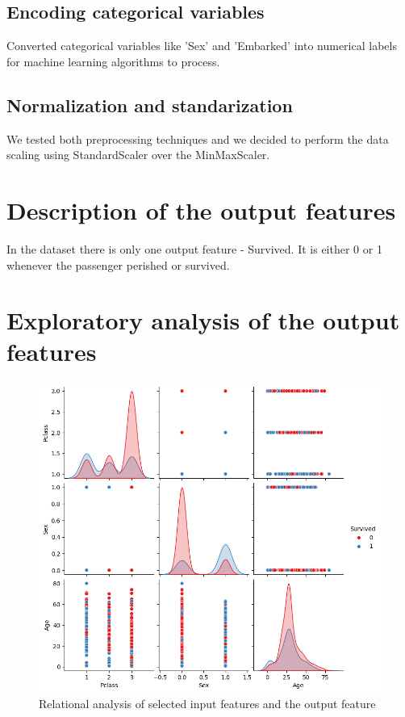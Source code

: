 \documentclass{article}
\begin{document}
\subsection{Encoding categorical variables}

Converted categorical variables like 'Sex' and 'Embarked' into numerical labels for machine learning algorithms to process.

\subsection{Normalization and standarization}

We tested both preprocessing techniques and we decided to perform the data scaling using StandardScaler over the MinMaxScaler.

\section{Description of the output features}

In the dataset there is only one output feature - Survived. It is either 0 or 1 whenever the passenger perished or survived.

\section{Exploratory analysis of the output features}

\begin{figure}[H]
    \centering
    \includegraphics[width=1\linewidth]{output_features.png}
    \caption{Relational analysis of selected input features and the output feature}
    \label{fig:pairwise-relationships analysis}
\end{figure}
\end{document}

